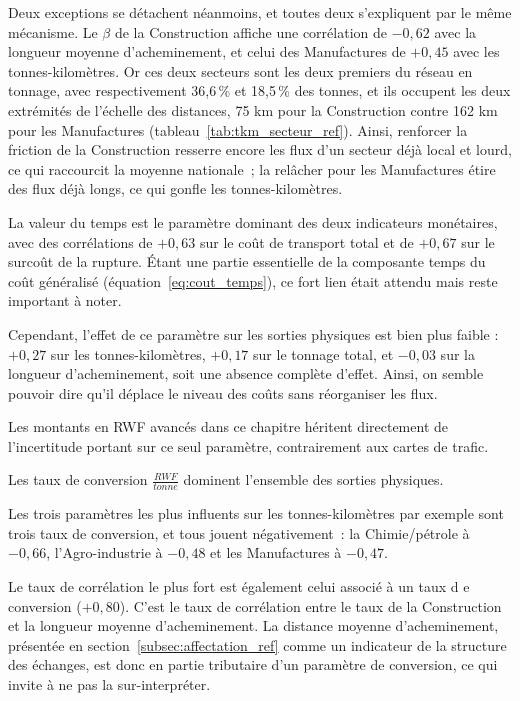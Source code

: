 \documentclass[12pt,a4paper,french]{report}
\begin{document}
	Deux exceptions se détachent néanmoins, et toutes deux s'expliquent par le même mécanisme. Le $\beta$ de la Construction affiche une corrélation de $-0{,}62$ avec la longueur moyenne d'acheminement, et celui des Manufactures de $+0{,}45$ avec les tonnes-kilomètres. Or ces deux secteurs sont les deux premiers du réseau en tonnage, avec respectivement 36,6\,\% et 18,5\,\% des tonnes, et ils occupent les deux extrémités de l'échelle des distances, 75 km pour la Construction contre 162 km pour les Manufactures (tableau~\ref{tab:tkm_secteur_ref}). Ainsi, renforcer la friction de la Construction resserre encore les flux d'un secteur déjà local et lourd, ce qui raccourcit la moyenne nationale~; la relâcher pour les Manufactures étire des flux déjà longs, ce qui gonfle les tonnes-kilomètres. 

\medskip

	La valeur du temps est le paramètre dominant des deux indicateurs monétaires, avec des corrélations de $+0{,}63$ sur le coût de transport total et de $+0{,}67$ sur le surcoût de la rupture. Étant une partie essentielle de la composante temps du coût généralisé (équation~\ref{eq:cout_temps}), ce fort lien était attendu mais reste important à noter.

	Cependant, l'effet de ce paramètre sur les sorties physiques est bien plus faible : $+0{,}27$ sur les tonnes-kilomètres, $+0{,}17$ sur le tonnage total, et $-0{,}03$ sur la longueur d'acheminement, soit une absence complète d'effet. Ainsi, on semble pouvoir dire qu'il déplace le niveau des coûts sans réorganiser les flux.

	Les montants en RWF avancés dans ce chapitre héritent directement de l'incertitude portant sur ce seul paramètre, contrairement aux cartes de trafic.  

	Les taux de conversion $\frac{RWF}{tonne}$ dominent l'ensemble des sorties physiques. 

	Les trois paramètres les plus influents sur les tonnes-kilomètres par exemple sont trois taux de conversion, et tous jouent négativement~: la Chimie/pétrole à $-0{,}66$, l'Agro-industrie à $-0{,}48$ et les Manufactures à $-0{,}47$. 
	
	Le taux de corrélation le plus fort est également celui associé à un taux d e conversion ($+0{,}80$). C'est le taux de corrélation entre le taux de la Construction et la longueur moyenne d'acheminement. La distance moyenne d'acheminement, présentée en section~\ref{subsec:affectation_ref} comme un indicateur de la structure des échanges, est donc en partie tributaire d'un paramètre de conversion, ce qui invite à ne pas la sur-interpréter.
\end{document}
